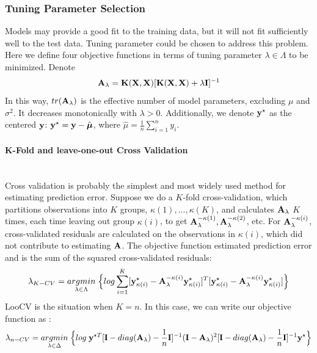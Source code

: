 \documentclass[11pt]{article}
\begin{document}
\subsubsection{{Tuning Parameter Selection}}
Models may provide a good fit to the training data, but it will not fit sufficiently well to the test data. Tuning parameter could be chosen to address this problem. Here we define four objective functions in terms of tuning parameter $\lambda \in \Lambda$ to be minimized. Denote
\begin{align}
{\bf A}_\lambda={\bf K}({\bf X}, {\bf X})[{\bf K}({\bf X}, {\bf X})+\lambda {\bf I}]^{-1}
\end{align}
In this way, $tr({\bf A}_\lambda)$ is the effective number of model parameters, excluding $\mu$ and $\sigma^2$. It decreases monotonically with $\lambda>0$. Additionally, we denote ${\bf y}^\star$ as the centered ${\bf y}$: ${\bf y}^\star={\bf y}-\hat{\boldsymbol{\mu}}$, where $\hat{\mu}=\frac{1}{n}\sum_{i=1}^ny_i$.

\paragraph{K-Fold and leave-one-out Cross Validation}\mbox{}\\
Cross validation is probably the simplest and most widely used method for estimating prediction error. Suppose we do a $K$-fold cross-validation, which partitions observations into $K$ groups, $\kappa(1),...,\kappa(K)$, and calculates ${\bf A}_\lambda$ $K$ times, each time leaving out group $\kappa(i)$, to get ${\bf A}_\lambda^{-\kappa(1)}, {\bf A}_\lambda^{-\kappa(2)}$, etc. For ${\bf A}_\lambda^{-\kappa(i)}$, cross-validated residuals are calculated on the observations in $\kappa(i)$, which did not contribute to estimating ${\bf A}$. The objective function estimated prediction error and is the sum of the squared cross-validated residuals:
\begin{align}
\lambda_{K-CV}=\underset{\lambda \in \Lambda}{argmin}\;\Big\{log\sum_{i=1}^K[{\bf y}_{\kappa(i)}^\star-{\bf A}_\lambda^{-\kappa(i)}{\bf y}_{\kappa(i)}^\star]^T[{\bf y}_{\kappa(i)}^\star-{\bf A}_\lambda^{-\kappa(i)}{\bf y}_{\kappa(i)}^\star]\Big\}
\end{align}
LooCV is the situation when $K=n$. In this case, we can write our objective function as \citep{golub_generalized_1979}:
\begin{align}
\lambda_{n-CV}=\underset{\lambda \in \Delta}{argmin}\;\Big\{log\;{\bf y}^{\star T}[{\bf I}-diag({\bf A}_\lambda)-\frac{1}{n}{\bf I}]^{-1}({\bf I}-{\bf A}_\lambda)^2[{\bf I}-diag({\bf A}_\lambda)-\frac{1}{n}{\bf I}]^{-1}{\bf y}^\star \Big\} \label{3}
\end{align}
\end{document}
